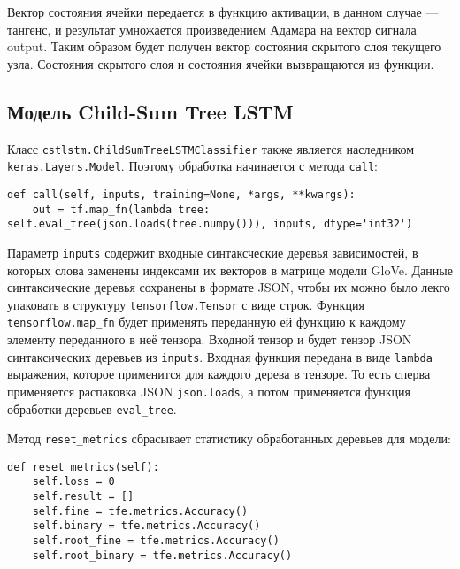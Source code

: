 Вектор состояния ячейки передается в функцию активации, в данном случае --- тангенс, и результат умножается произведением Адамара на вектор сигнала output. Таким образом будет получен вектор состояния скрытого слоя текущего узла. Состояния скрытого слоя и состояния ячейки вызвращаются из функции.

\subsection{Модель Child-Sum Tree LSTM}
Класс \texttt{cstlstm.ChildSumTreeLSTMClassifier} также является наследником \texttt{keras.Layers.Model}. Поэтому обработка начинается с метода \texttt{call}:
\medskip
\begin{lstlisting}[style=Python]
  def call(self, inputs, training=None, *args, **kwargs):
    out = tf.map_fn(lambda tree: self.eval_tree(json.loads(tree.numpy())), inputs, dtype='int32')
\end{lstlisting}
\medskip

Параметр \texttt{inputs} содержит входные синтаксческие деревья зависимостей, в которых слова заменены индексами их векторов в матрице модели GloVe. Данные синтаксические деревья сохранены в формате JSON, чтобы их можно было лекго упаковать в структуру \texttt{tensorflow.Tensor} с виде строк. Функция \texttt{tensorflow.map\_fn} будет применять переданную ей функцию к каждому элементу переданного в неё тензора. Входной тензор и будет тензор JSON синтаксических деревьев из \texttt{inputs}. Входная функция передана в виде \texttt{lambda} выражения, которое применится для каждого дерева в тензоре. То есть сперва применяется распаковка JSON \texttt{json.loads}, а потом применяется функция обработки деревьев \texttt{eval\_tree}.

Метод \texttt{reset\_metrics} сбрасывает статистику обработанных деревьев для модели:
\medskip
\begin{lstlisting}[style=Python]
  def reset_metrics(self):
    self.loss = 0
    self.result = []
    self.fine = tfe.metrics.Accuracy()
    self.binary = tfe.metrics.Accuracy()
    self.root_fine = tfe.metrics.Accuracy()
    self.root_binary = tfe.metrics.Accuracy()
\end{lstlisting}
\medskip

